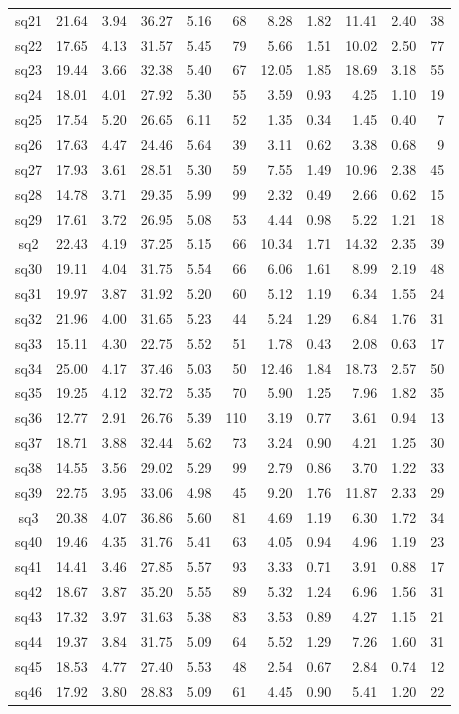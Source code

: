 {\begin{longtable}{@{}cr@{\hspace{1em}}r@{\hspace{1em}}r@{\hspace{1em}}r@{\hspace{1em}}r@{\hspace{2em}}r@{\hspace{1em}}r@{\hspace{1em}}r@{\hspace{1em}}r@{\hspace{1em}}r@{}}
sq21&21.64&3.94&36.27&5.16&68&8.28&1.82&11.41&2.40&38\\
sq22&17.65&4.13&31.57&5.45&79&5.66&1.51&10.02&2.50&77\\
sq23&19.44&3.66&32.38&5.40&67&12.05&1.85&18.69&3.18&55\\
sq24&18.01&4.01&27.92&5.30&55&3.59&0.93&4.25&1.10&19\\
sq25&17.54&5.20&26.65&6.11&52&1.35&0.34&1.45&0.40& 7\\
sq26&17.63&4.47&24.46&5.64&39&3.11&0.62&3.38&0.68& 9\\
sq27&17.93&3.61&28.51&5.30&59&7.55&1.49&10.96&2.38&45\\
sq28&14.78&3.71&29.35&5.99&99&2.32&0.49&2.66&0.62&15\\
sq29&17.61&3.72&26.95&5.08&53&4.44&0.98&5.22&1.21&18\\
sq2&22.43&4.19&37.25&5.15&66&10.34&1.71&14.32&2.35&39\\
sq30&19.11&4.04&31.75&5.54&66&6.06&1.61&8.99&2.19&48\\
sq31&19.97&3.87&31.92&5.20&60&5.12&1.19&6.34&1.55&24\\
sq32&21.96&4.00&31.65&5.23&44&5.24&1.29&6.84&1.76&31\\
sq33&15.11&4.30&22.75&5.52&51&1.78&0.43&2.08&0.63&17\\
sq34&25.00&4.17&37.46&5.03&50&12.46&1.84&18.73&2.57&50\\
sq35&19.25&4.12&32.72&5.35&70&5.90&1.25&7.96&1.82&35\\
sq36&12.77&2.91&26.76&5.39&110&3.19&0.77&3.61&0.94&13\\
sq37&18.71&3.88&32.44&5.62&73&3.24&0.90&4.21&1.25&30\\
sq38&14.55&3.56&29.02&5.29&99&2.79&0.86&3.70&1.22&33\\
sq39&22.75&3.95&33.06&4.98&45&9.20&1.76&11.87&2.33&29\\
sq3&20.38&4.07&36.86&5.60&81&4.69&1.19&6.30&1.72&34\\
sq40&19.46&4.35&31.76&5.41&63&4.05&0.94&4.96&1.19&23\\
sq41&14.41&3.46&27.85&5.57&93&3.33&0.71&3.91&0.88&17\\
sq42&18.67&3.87&35.20&5.55&89&5.32&1.24&6.96&1.56&31\\
sq43&17.32&3.97&31.63&5.38&83&3.53&0.89&4.27&1.15&21\\
sq44&19.37&3.84&31.75&5.09&64&5.52&1.29&7.26&1.60&31\\
sq45&18.53&4.77&27.40&5.53&48&2.54&0.67&2.84&0.74&12\\
sq46&17.92&3.80&28.83&5.09&61&4.45&0.90&5.41&1.20&22\\

\end{longtable}}
